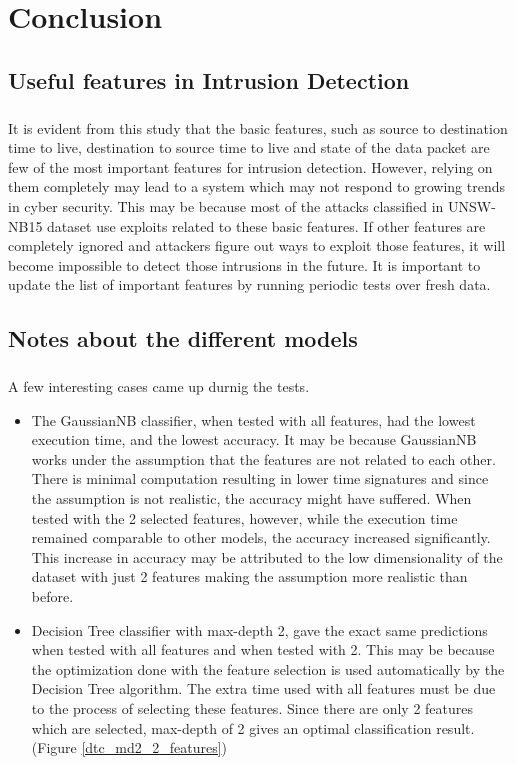 \chapter{Conclusion}

\section{Useful features in Intrusion Detection}

\paragraph{}
It is evident from this study that the basic features, such as source to destination time to live, destination to source time to live and state of the data packet are few of the most important features for intrusion detection. However, relying on them completely may lead to a system which may not respond to growing trends in cyber security. This may be because most of the attacks classified in UNSW-NB15 dataset use exploits related to these basic features. If other features are completely ignored and attackers figure out ways to exploit those features, it will become impossible to detect those intrusions in the future. It is important to update the list of important features by running periodic tests over fresh data.

\section{Notes about the different models}

\paragraph{}
A few interesting cases came up durnig the tests.
\begin{itemize}
    \item The GaussianNB classifier, when tested with all features, had the lowest execution time, and the lowest accuracy. It may be because GaussianNB works under the assumption that the features are not related to each other. There is minimal computation resulting in lower time signatures and since the assumption is not realistic, the accuracy might have suffered. When tested with the 2 selected features, however, while the execution time remained comparable to other models, the accuracy increased significantly. This increase in accuracy may be attributed to the low dimensionality of the dataset with just 2 features making the assumption more realistic than before.
    \item Decision Tree classifier with max-depth 2, gave the exact same predictions when tested with all features and when tested with 2. This may be because the optimization done with the feature selection is used automatically by the Decision Tree algorithm. The extra time used with all features must be due to the process of selecting these features. Since there are only 2 features which are selected, max-depth of 2 gives an optimal classification result. (Figure \ref{dtc_md2_2_features})
\end{itemize}

